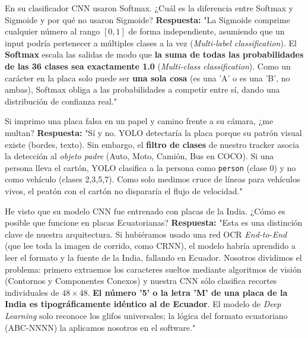 \documentclass[11pt,a4paper]{article}
\begin{document}
\begin{pregunta}{En su clasificador CNN usaron Softmax. ¿Cu\'al es la diferencia entre Softmax y Sigmoide y por qu\'e no usaron Sigmoide?}
    \textbf{Respuesta:} "La Sigmoide comprime cualquier n\'umero al rango $[0,1]$ de forma independiente, asumiendo que un input podr\'ia pertenecer a m\'ultiples clases a la vez (\emph{Multi-label classification}). El \textbf{Softmax} escala las salidas de modo que \textbf{la suma de todas las probabilidades de las 36 clases sea exactamente 1.0} (\emph{Multi-class classification}). Como un car\'acter en la placa solo puede ser \textbf{una sola cosa} (es una 'A' o es una 'B', no ambas), Softmax obliga a las probabilidades a competir entre s\'i, dando una distribuci\'on de confianza real."
\end{pregunta}

\begin{trampa}{Si imprimo una placa falsa en un papel y camino frente a su c\'amara, ¿me multan?}
    \textbf{Respuesta:} "S\'i y no. YOLO detectar\'ia la placa porque su patr\'on visual existe (bordes, texto). Sin embargo, el \textbf{filtro de clases} de nuestro tracker asocia la detecci\'on al \emph{objeto padre} (Auto, Moto, Camión, Bus en COCO). Si una persona lleva el cart\'on, YOLO clasifica a la persona como \texttt{person} (clase 0) y no como veh\'iculo (clases 2,3,5,7). Como solo medimos cruce de l\'ineas para veh\'iculos vivos, el peat\'on con el cart\'on no disparar\'ia el flujo de velocidad."
\end{trampa}

\begin{pregunta}{He visto que su modelo CNN fue entrenado con placas de la India. ¿C\'omo es posible que funcione en placas Ecuatorianas?}
    \textbf{Respuesta:} "Esta es una distinci\'on clave de nuestra arquitectura. Si hubi\'eramos usado una red OCR \emph{End-to-End} (que lee toda la imagen de corrido, como CRNN), el modelo habr\'ia aprendido a leer el formato y la fuente de la India, fallando en Ecuador. 
    Nosotros dividimos el problema: primero extraemos los caracteres sueltos mediante algoritmos de visi\'on (Contornos y Componentes Conexos) y nuestra CNN s\'olo clasifica recortes individuales de $48\times 48$. \textbf{El n\'umero '5' o la letra 'M' de una placa de la India es tipogr\'aficamente id\'entico al de Ecuador}. El modelo de \emph{Deep Learning} solo reconoce los glifos universales; la l\'ogica del formato ecuatoriano (ABC-NNNN) la aplicamos nosotros en el software."
\end{pregunta}
\end{document}
